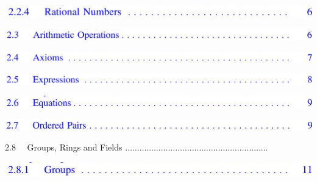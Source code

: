 \documentclass[10pt]{article}
\begin{document}
\begin{center}
\includegraphics[max width=\textwidth]{2023_04_20_41f1ceac5a31dc7d1b59g-009(9)}
\end{center}

\begin{center}
\includegraphics[max width=\textwidth]{2023_04_20_41f1ceac5a31dc7d1b59g-009(15)}
\end{center}

\begin{center}
\includegraphics[max width=\textwidth]{2023_04_20_41f1ceac5a31dc7d1b59g-009(4)}
\end{center}

\begin{center}
\includegraphics[max width=\textwidth]{2023_04_20_41f1ceac5a31dc7d1b59g-009(1)}
\end{center}

\begin{center}
\includegraphics[max width=\textwidth]{2023_04_20_41f1ceac5a31dc7d1b59g-009(8)}
\end{center}

\begin{center}
\includegraphics[max width=\textwidth]{2023_04_20_41f1ceac5a31dc7d1b59g-009}
\end{center}

$2.8 \quad$ Groups, Rings and Fields $\ldots \ldots \ldots \ldots \ldots \ldots \ldots \ldots \ldots \ldots \ldots \ldots \ldots \ldots \ldots \ldots \ldots \ldots \ldots \ldots$

\begin{center}
\includegraphics[max width=\textwidth]{2023_04_20_41f1ceac5a31dc7d1b59g-009(14)}
\end{center}
\end{document}
